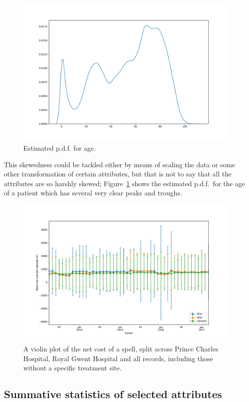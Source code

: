 \documentclass{article}
\begin{document}
\begin{figure}[h]
    \begin{minipage}{.5\textwidth}
	    \centering
	    \includegraphics[width=\linewidth]{img/Age-kde.pdf}
	    \caption{Estimated p.d.f. for age.}
	    \label{fig:Age-kde}
    \end{minipage}
\end{figure}

This skewedness could be tackled either by means of scaling the data or some
other transformation of certain attributes, but that is not to say that 
all the attributes are so harshly skewed; Figure~\ref{fig:Age-kde} shows the
estimated p.d.f.\ for the age of a patient which has several very clear peaks 
and troughs.\\

\begin{figure}[h]
	\centering
	\includegraphics[width=.5\linewidth]{img/Mean-NetCost-by-site.pdf}
	\caption{A violin plot of the net cost of a spell, split across Prince 
        Charles Hospital, Royal Gwent Hospital and all records, including those
        without a specific treatment site.}
    \label{fig:mean-cost-by-site}
\end{figure}


\subsection{Summative statistics of selected attributes}\label{subsec:summative}
\end{document}
